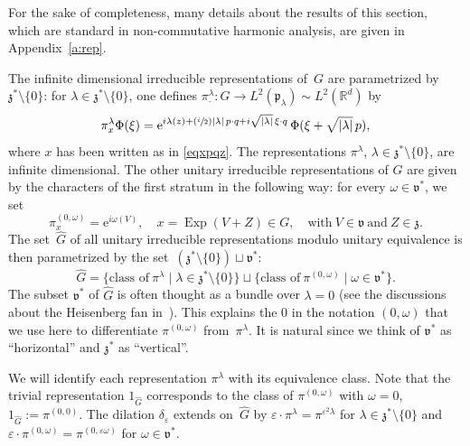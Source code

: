 \documentclass[JEP,XML,SOM,Unicode,published]{cedram}
\newcommand{\Psfrac}[2]{(\sfrac{#1}{#2})}
\let\sep\mid
\newcommand{\rme}{\mathrm{e}}
\DeclareMathOperator{\Exp}{Exp}
\theoremstyle{plain}
\theoremstyle{definition}
\let\eps\varepsilon
\def\R{{\mathbb R}}
\begin{document}
For the sake of completeness, many details about the results of this section, which are standard in non-commutative harmonic analysis, are given in Appendix~\ref{a:rep}.

The infinite dimensional irreducible representations of~$G$ are parametrized by \hbox{$\mathfrak z^*\!\setminus\!\{0\}$}:
for $\lambda\in \mathfrak z^*\setminus\{0\}$, one defines $\pi_{\cdot}^\lambda:G\to L^2(\mathfrak p_\lambda) \sim L^2(\R^d)$ by
\begin{equation}\label{def:pilambda}
\pi^{\lambda}_{x} \Phi(\xi)=
\rme^{i\lambda(z)+ \Psfrac i2 |\lambda|\,p \cdot q +i\sqrt{|\lambda|} \,\xi \cdot q} \,\Phi(\xi+\sqrt{|\lambda|}\,p),
\end{equation}
where $x$ has been written as in \eqref{eqxpqz}.
The representations $\pi^\lambda$, $\lambda\in \mathfrak z^*\setminus\{0\}$, are infinite dimensional.
The other unitary irreducible representations of $G$
are given by the characters of the first stratum in the following way:
for every $\omega\in \mathfrak v ^*$,
we set
\begin{equation}\label{eq:0omega}
\pi^{(0,\omega)}_x= \rme^{i \omega(V)}, \quad
x=\Exp (V+Z)\in G, \quad\mbox{with}\ V\in{\mathfrak v} \ \mbox{and} \ Z\in{\mathfrak z}.
\end{equation}
The set~$\widehat G$ of all unitary irreducible representations modulo unitary equivalence
is then parametrized by the set~$({\mathfrak z}^*\setminus \{0\})\sqcup {\mathfrak v}^*$:
\begin{equation}
\label{eq_widehatG}	
\widehat G =
\{\mbox{class of} \ \pi^\lambda \sep \lambda \in \mathfrak z^* \setminus\{0\}\}
\sqcup \{\mbox{class of} \ \pi^{(0,\omega)} \sep \omega \in \mathfrak v^* \}.
\end{equation}
The subset $\mathfrak v^*$ of $\widehat G$ is often thought as a bundle over $\lambda=0$ (see the discussions about the Heisenberg fan in~\cite[Lem.\,2.2]{FF1}). This explains the $0$ in the notation $(0,\omega)$ that we use here to differentiate $\pi^{(0,\omega)}$ from~$\pi^\lambda$. It is natural since we think of $\mathfrak v^*$ as ``horizontal'' and $\mathfrak z^*$ as ``vertical''.

We will identify each representation $\pi^\lambda$ with its equivalence class.
Note that the trivial representation $1_{\widehat G}$ corresponds to the class of $\pi^{(0,\omega)}$ with
$\omega=0$, \ie $
1_{\widehat G}
:=
\pi^{(0,0)}.
$
The dilation $\delta_\eps$ extends on~$\widehat G$ by $\eps \cdot\pi^ \lambda=\pi^{\eps^2 \lambda} $ for $\lambda\in\mathfrak z^*\setminus \{0\}$ and $\eps \cdot \pi^{(0,\omega) }= \pi^{(0,\eps \omega)} $ for $\omega\in\mathfrak v^*$.
\end{document}

